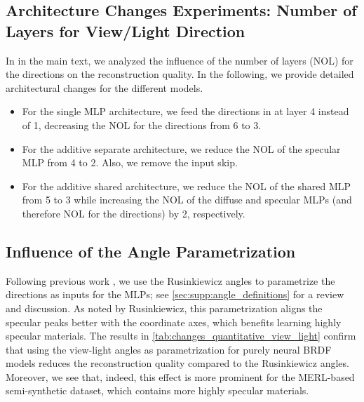 \subsection{Architecture Changes Experiments: Number of Layers for View/Light Direction}
\label{sec:supp:arch_changes_view_light_exps}

In
\iftoggle{arxiv}{\cref{sec:analysis_brdf_models}}{Sec.~6.2}
in the main text, we analyzed the influence of the number of layers (NOL) for the directions on the reconstruction quality. In the following, we provide detailed architectural changes for the different models.

\begin{itemize}
    \item For the single MLP architecture, we feed the directions in at layer 4 instead of 1, decreasing the NOL for the directions from 6 to 3.
    \item For the additive separate architecture, we reduce the NOL of the specular MLP from 4 to 2. Also, we remove the input skip.
    \item For the additive shared architecture, we reduce the NOL of the shared MLP from 5 to 3 while increasing the NOL of the diffuse and specular MLPs (and therefore NOL for the directions) by 2, respectively.
\end{itemize}


\subsection{Influence of the Angle Parametrization}
\label{sec:supp:exps_angle_param}



Following previous work \cite{Zhang2021NeRFactor, sztrajman2021neural}, we use the Rusinkiewicz angles \cite{rusinkiewicz1998new} to parametrize the directions as inputs for the MLPs; see \cref{sec:supp:angle_definitions} for a review and discussion. As noted by Rusinkiewicz, this parametrization aligns the specular peaks better with the coordinate axes, which benefits learning highly specular materials. The results in \cref{tab:changes_quantitative_view_light} confirm that using the view-light angles as parametrization for purely neural BRDF models reduces the reconstruction quality compared to the Rusinkiewicz angles. Moreover, we see that, indeed, this effect is more prominent for the MERL-based semi-synthetic dataset, which contains more highly specular materials.


